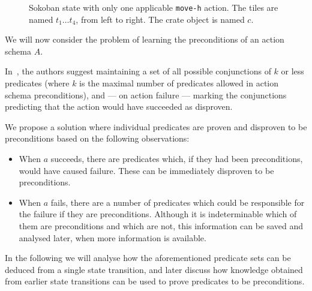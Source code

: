 \documentclass[../Master.tex]{subfiles}
\providecommand{\master}{..}
\begin{document}
\begin{figure}
    \centering
    \resizebox{0.4\textwidth}{!}{}
    \caption{\label{fig:sokoSmall} Sokoban state with only one applicable \texttt{move-h} action. The tiles are named $t_1 \dots t_4$, from left to right. The crate object is named $c$.}
\end{figure}

We will now consider the problem of learning the preconditions of an action schema $A$.

In~\cite{Walsh2008}, the authors suggest maintaining a set of all possible conjunctions of $k$ or less predicates (where $k$ is the maximal number of predicates allowed in action schema preconditions), and --- on action failure --- marking the conjunctions predicting that the action would have succeeded as disproven.

We propose a solution where individual predicates are proven and disproven to be preconditions based on the following observations:
\begin{itemize}
    \item When $a$ succeeds, there are predicates which, if they had been preconditions, would have caused failure. These can be immediately disproven to be preconditions.
    \item When $a$ fails, there are a number of predicates which could be responsible for the failure if they are preconditions. Although it is indeterminable which of them are preconditions and which are not, this information can be saved and analysed later, when more information is available.
\end{itemize}

In the following we will analyse how the aforementioned predicate sets can be deduced from a single state transition, and later discuss how knowledge obtained from earlier state transitions can be used to prove predicates to be preconditions.
\end{document}
